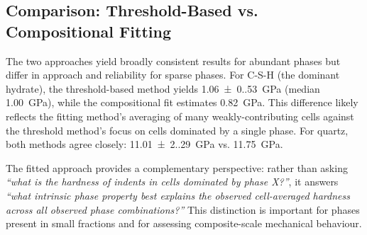 \subsection*{Comparison: Threshold-Based vs. Compositional Fitting}

The two approaches yield broadly consistent results for abundant phases but differ in approach and reliability for sparse phases.
For C-S-H (the dominant hydrate), the threshold-based method yields \qty{1.06(0.53)}{\giga\pascal} (median \qty{1.00}{\giga\pascal}), while the compositional fit estimates \qty{0.82}{\giga\pascal}.
This difference likely reflects the fitting method's averaging of many weakly-contributing cells against the threshold method's focus on cells dominated by a single phase.
For quartz, both methods agree closely: \qty{11.01(2.29)}{\giga\pascal} vs. \qty{11.75}{\giga\pascal}.

The fitted approach provides a complementary perspective: rather than asking \textit{``what is the hardness of indents in cells dominated by phase X?''}, it answers \textit{``what intrinsic phase property best explains the observed cell-averaged hardness across all observed phase combinations?''}
This distinction is important for phases present in small fractions and for assessing composite-scale mechanical behaviour.


